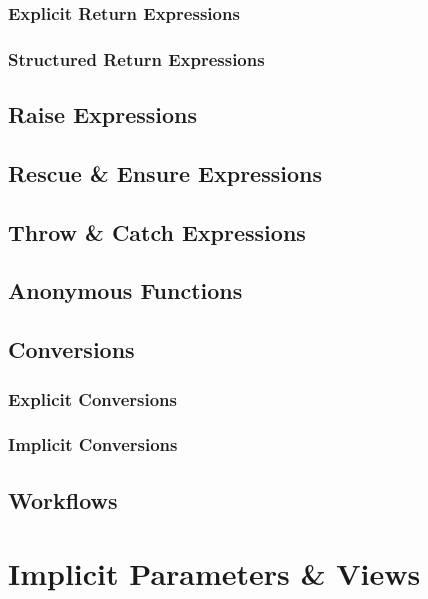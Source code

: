 \subsection{Explicit Return Expressions}

\subsection{Structured Return Expressions}

\section{Raise Expressions}

\section{Rescue \& Ensure Expressions}


\section{Throw \& Catch Expressions}

\section{Anonymous Functions}

\section{Conversions}

\subsection{Explicit Conversions}

\subsection{Implicit Conversions}
\label{sec:implicit-conversions}

\section{Workflows}
\label{sec:workflows}

\chapter{Implicit Parameters \& Views}

